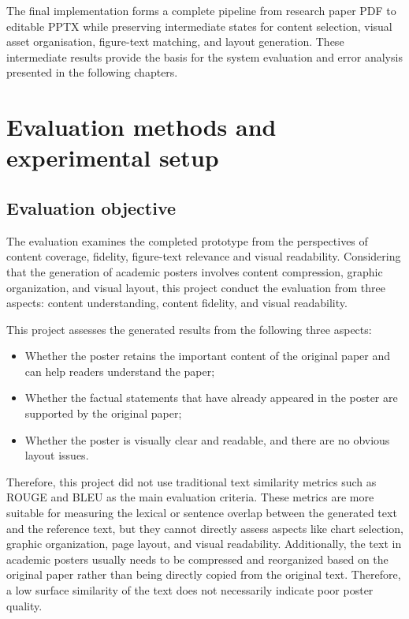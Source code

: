 \documentclass[12pt,oneside]{report}
\begin{document}
\vspace{1em}

The final implementation forms a complete pipeline from research paper PDF to editable PPTX while preserving intermediate states for content selection, visual asset organisation, figure-text matching, and layout generation. These intermediate results provide the basis for the system evaluation and error analysis presented in the following chapters.


\chapter{Evaluation methods and experimental setup}

\section{Evaluation objective}

The evaluation examines the completed prototype from the perspectives of content coverage, fidelity, figure-text relevance and visual readability. Considering that the generation of academic posters involves content compression, graphic organization, and visual layout, this project conduct the evaluation from three aspects: content understanding, content fidelity, and visual readability.

\vspace{1em}

This project assesses the generated results from the following three aspects:

\begin{itemize}
    \item Whether the poster retains the important content of the original paper and can help readers understand the paper;
    \item Whether the factual statements that have already appeared in the poster are supported by the original paper;
    \item Whether the poster is visually clear and readable, and there are no obvious layout issues.
\end{itemize}

Therefore, this project did not use traditional text similarity metrics such as ROUGE and BLEU as the main evaluation criteria. These metrics are more suitable for measuring the lexical or sentence overlap between the generated text and the reference text, but they cannot directly assess aspects like chart selection, graphic organization, page layout, and visual readability. Additionally, the text in academic posters usually needs to be compressed and reorganized based on the original paper rather than being directly copied from the original text. Therefore, a low surface similarity of the text does not necessarily indicate poor poster quality.
\end{document}
